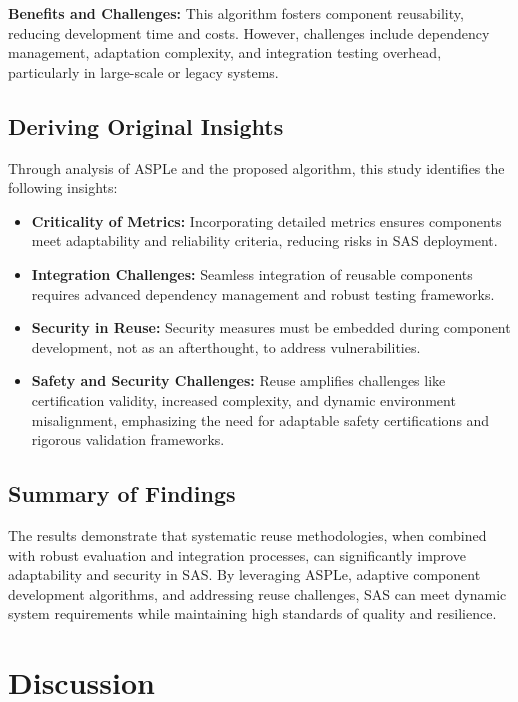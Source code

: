 \documentclass[a4paper,10pt]{article}
\begin{document}
\textbf{Benefits and Challenges:} This algorithm fosters component reusability, reducing development time and costs. However, challenges include dependency management, adaptation complexity, and integration testing overhead, particularly in large-scale or legacy systems.

\subsection{Deriving Original Insights}

Through analysis of ASPLe and the proposed algorithm, this study identifies the following insights:
\begin{itemize}
    \item \textbf{Criticality of Metrics:} Incorporating detailed metrics ensures components meet adaptability and reliability criteria, reducing risks in SAS deployment.
    \item \textbf{Integration Challenges:} Seamless integration of reusable components requires advanced dependency management and robust testing frameworks.
    \item \textbf{Security in Reuse:} Security measures must be embedded during component development, not as an afterthought, to address vulnerabilities.
    \item \textbf{Safety and Security Challenges:} Reuse amplifies challenges like certification validity, increased complexity, and dynamic environment misalignment, emphasizing the need for adaptable safety certifications and rigorous validation frameworks.
\end{itemize}

\subsection{Summary of Findings}

The results demonstrate that systematic reuse methodologies, when combined with robust evaluation and integration processes, can significantly improve adaptability and security in SAS. By leveraging ASPLe, adaptive component development algorithms, and addressing reuse challenges, SAS can meet dynamic system requirements while maintaining high standards of quality and resilience.


\section{Discussion}
\end{document}
